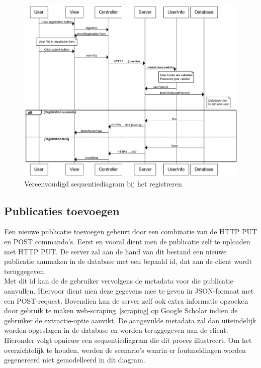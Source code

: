 \documentclass{article}
\begin{document}
\begin{figure}[!h]
\centering
 \includegraphics[width=145mm]{registration-sequence.png}
 \caption{Vereenvoudigd sequentiediagram bij het registreren}
 \label{register-sequence}
\end{figure}

\subsection{Publicaties toevoegen}

Een nieuwe publicatie toevoegen gebeurt door een combinatie van de HTTP PUT en POST commando's. Eerst en vooral dient men de publicatie zelf te uploaden met HTTP PUT. De server zal aan de hand van dit bestand een nieuwe publicatie aanmaken in de database met een bepaald id, dat aan de client wordt teruggegeven. \\

Met dit id kan de de gebruiker vervolgens de metadata voor die publicatie aanvullen. Hiervoor dient men deze gegevens mee te geven in JSON-formaat met een POST-request. Bovendien kan de server zelf ook extra informatie opzoeken door gebruik te maken web-scraping~\ref{scraping} op Google Scholar indien de gebruiker de extractie-optie aanvikt. De aangevulde metadata zal dan uiteindelijk worden opgeslagen in de database en worden teruggegeven aan de client. \\

Hieronder volgt opnieuw een sequentiediagram die dit proces illustreert. Om het overzichtelijk te houden, werden de scenario's waarin er foutmeldingen worden gegenereerd niet gemodelleerd in dit diagram.
\end{document}
